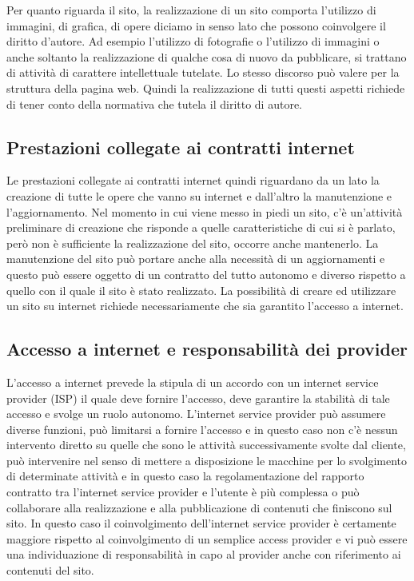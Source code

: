  Per quanto riguarda il sito, la realizzazione di un sito comporta l'utilizzo di immagini, di grafica, di opere diciamo in senso lato che possono coinvolgere il diritto d'autore. Ad esempio l'utilizzo di fotografie o l'utilizzo di immagini o anche soltanto la realizzazione di qualche cosa di nuovo da pubblicare, si trattano di attività di carattere intellettuale tutelate. Lo stesso discorso può valere per la struttura della pagina web. Quindi la realizzazione di tutti questi aspetti richiede di tener conto della normativa che tutela il diritto di autore. 
 

\subsection{Prestazioni collegate ai contratti internet}
Le prestazioni collegate ai contratti internet quindi riguardano da un lato la creazione di tutte le opere che vanno su internet e dall'altro la manutenzione e l'aggiornamento. 
Nel momento in cui viene messo in piedi un sito, c'è un'attività preliminare di creazione che risponde a quelle caratteristiche di cui si è parlato, però non è sufficiente la realizzazione del sito, occorre anche mantenerlo. La manutenzione del sito può portare anche alla necessità di un aggiornamenti  e questo può essere oggetto di un contratto del tutto autonomo e diverso rispetto a quello con il quale il sito è stato realizzato. 
La possibilità di creare ed utilizzare un sito su internet richiede necessariamente che sia garantito l'accesso a internet. 

\subsection{Accesso a internet e responsabilità dei provider}
L'accesso a internet prevede la stipula di un accordo con un internet service provider (ISP) il quale deve fornire l'accesso, deve garantire la stabilità di tale accesso e svolge un ruolo autonomo. L'internet service provider può assumere diverse funzioni, può limitarsi a fornire l'accesso e in questo caso non c'è nessun intervento diretto su quelle che sono le attività successivamente svolte dal cliente, può intervenire nel senso di mettere a disposizione le macchine per lo svolgimento di determinate attività e in questo caso la regolamentazione del rapporto contratto tra l'internet service provider e l'utente è più complessa o può collaborare alla realizzazione e alla pubblicazione di contenuti che finiscono sul sito. In questo caso il coinvolgimento dell'internet service provider è certamente maggiore rispetto al coinvolgimento di un semplice access provider e vi può essere una individuazione di responsabilità in capo al provider anche con riferimento ai contenuti del sito. 

